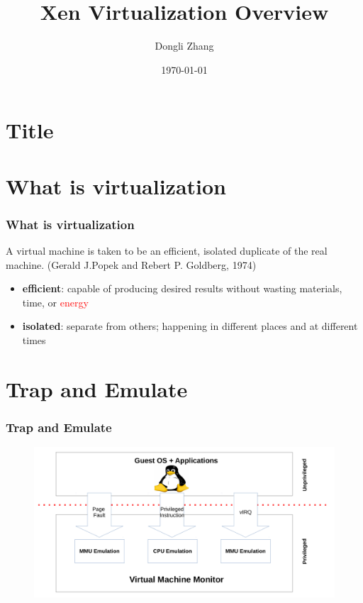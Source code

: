 \documentclass[aspectratio=169]{beamer}
\title[Xen Overview]{Xen Virtualization Overview} %
\author{Dongli Zhang} %
\institute[Oracle] %
{
Oracle Asia Research and Development Centers (Beijing) \\ %
\medskip
\textit{dongli.zhang@oracle.com} %
}
\date{\today} %
\begin{document}

\section{Title}
\begin{frame}
\titlepage %
\end{frame}


\section{What is virtualization}
\begin{frame}
\frametitle{What is virtualization}
A virtual machine is taken to be an efficient, isolated duplicate of the real machine. (Gerald J.Popek and Rebert P. Goldberg, 1974) \pause
\begin{itemize}
\item \textbf{efficient}: capable of producing desired results without wasting materials, time, or \textcolor<3->{red}{energy}\pause \pause
\item \textbf{isolated}: separate from others; happening in different places and at different times
\end{itemize}
\end{frame}


\section{Trap and Emulate}
\begin{frame}
\frametitle{Trap and Emulate}
\begin{figure}
\includegraphics[width=1.0\linewidth]{figures/trapemu.pdf}
\end{figure}
\end{frame}
\end{document}
